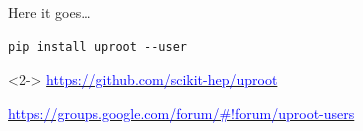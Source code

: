 \documentclass[aspectratio=169]{beamer}
\begin{document}
\begin{frame}[fragile]{Here it goes\ldots}
\vspace{0.5 cm}
\huge
\begin{center}
\begin{minipage}{0.8\linewidth}
\begin{verbatim}
pip install uproot --user
\end{verbatim}
\end{minipage}

\Large
\begin{uncoverenv}<2->
\vspace{1.5 cm}
\href{https://github.com/scikit-hep/uproot}{\textcolor{blue}{https://github.com/scikit-hep/uproot}}

\vspace{1 cm}
\href{https://groups.google.com/forum/#!forum/uproot-users}{\textcolor{blue}{https://groups.google.com/forum/\#!forum/uproot-users}}
\end{uncoverenv}
\end{center}
\end{frame}
\end{document}
